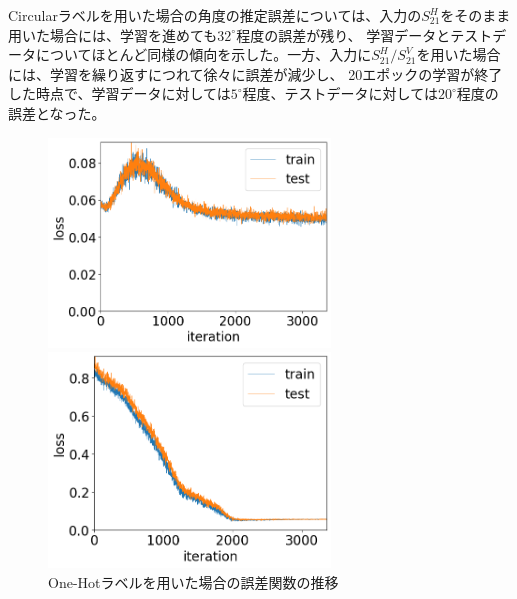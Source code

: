 \documentclass[11pt,a4paper,uplatex]{ujarticle}
\begin{document}
  Circularラベルを用いた場合の角度の推定誤差については、入力の$S_{21}^H$をそのまま用いた場合には、学習を進めても$32^{\circ}$程度の誤差が残り、
  学習データとテストデータについてほとんど同様の傾向を示した。一方、入力に$S_{21}^H/S_{21}^V$を用いた場合には、学習を繰り返すにつれて徐々に誤差が減少し、
  20エポックの学習が終了した時点で、学習データに対しては$5^{\circ}$程度、テストデータに対しては$20^{\circ}$程度の誤差となった。

  \clearpage
  \begin{figure}[tbp]
    \begin{minipage}[b]{0.495\textwidth}
      \centering
      \includegraphics[keepaspectratio, width=75mm]{Images/python/loss_202402051754.png}
    \end{minipage}
    \begin{minipage}[b]{0.495\textwidth}
      \centering
      \includegraphics[keepaspectratio, width=75mm]{Images/python/loss_202402052233.png}
    \end{minipage}
    \caption{One-Hotラベルを用いた場合の誤差関数の推移}
    \label{fig:loss_onehot}
  \end{figure}
\end{document}
